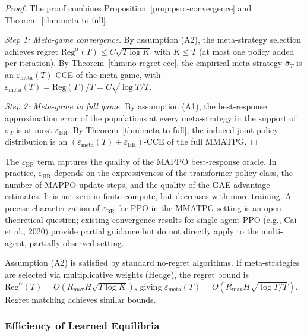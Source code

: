 \begin{proof}
The proof combines Proposition~\ref{prop:psro-convergence} and Theorem~\ref{thm:meta-to-full}.

\emph{Step 1: Meta-game convergence.} By assumption (A2), the meta-strategy selection achieves regret $\mathrm{Reg}^\alpha(T) \le C\sqrt{T\log K}$ with $K \le T$ (at most one policy added per iteration). By Theorem~\ref{thm:no-regret-cce}, the empirical meta-strategy $\bar\sigma_T$ is an $\varepsilon_{\mathrm{meta}}(T)$-CCE of the meta-game, with $\varepsilon_{\mathrm{meta}}(T) = \mathrm{Reg}(T)/T = C\sqrt{\log T/T}$.

\emph{Step 2: Meta-game to full game.} By assumption (A1), the best-response approximation error of the populations at every meta-strategy in the support of $\bar\sigma_T$ is at most $\varepsilon_{\mathrm{BR}}$. By Theorem~\ref{thm:meta-to-full}, the induced joint policy distribution is an $(\varepsilon_{\mathrm{meta}}(T) + \varepsilon_{\mathrm{BR}})$-CCE of the full MMATPG.
\end{proof}

\begin{remark}[On assumption (A1)]
The $\varepsilon_{\mathrm{BR}}$ term captures the quality of the MAPPO best-response oracle. In practice, $\varepsilon_{\mathrm{BR}}$ depends on the expressiveness of the transformer policy class, the number of MAPPO update steps, and the quality of the GAE advantage estimates. It is not zero in finite compute, but decreases with more training. A precise characterization of $\varepsilon_{\mathrm{BR}}$ for PPO in the MMATPG setting is an open theoretical question; existing convergence results for single-agent PPO (e.g., Cai et al., 2020) provide partial guidance but do not directly apply to the multi-agent, partially observed setting.
\end{remark}

\begin{remark}[On assumption (A2)]
Assumption (A2) is satisfied by standard no-regret algorithms. If meta-strategies are selected via multiplicative weights (Hedge), the regret bound is $\mathrm{Reg}^\alpha(T) = O(R_{\max}H\sqrt{T\log K})$, giving $\varepsilon_{\mathrm{meta}}(T) = O(R_{\max}H\sqrt{\log T/T})$. Regret matching achieves similar bounds.
\end{remark}


\subsubsection{Efficiency of Learned Equilibria}

